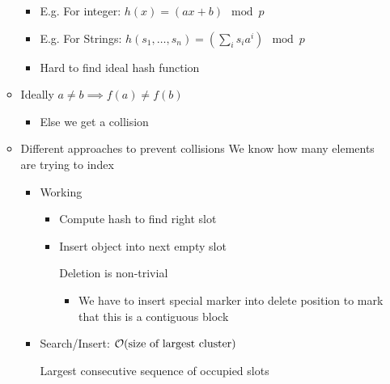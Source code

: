 \begin{itemize}
\begin{itemize}
\begin{itemize}
                    \item E.g. For integer: $h(x) = (ax + b) \mod p$
                    \item E.g. For Strings: $h(s_1, \dots, s_n) = (\sum_{i} s_ia^i) \mod p$
                    \item Hard to find ideal hash function
                \end{itemize}
            \item Ideally $a \neq b \implies f(a) \neq f(b)$
                \begin{itemize}
                    \item Else we get a collision
                \end{itemize}
            \item Different approaches to prevent collisions
             We know how many elements are trying to index
                \begin{itemize}
                        \begin{itemize}
                            \item Working
                                \begin{itemize}
                                    \item Compute hash to find right slot
                                    \item Insert object into next empty slot
                                        \begin{itemize}
                                            \icon Deletion is non-trivial
                                                \begin{itemize}
                                                    \item We have to insert special marker into delete position to mark that this is a contiguous block
                                                \end{itemize}
                                        \end{itemize}
                                \end{itemize}
                            \item Search/Insert: $\mathcal{O}(\text{size of largest cluster})$
                                \begin{itemize}
                                     Largest consecutive sequence of occupied slots
                                \end{itemize}

\end{itemize}
\end{itemize}
\end{itemize}
\end{itemize}

